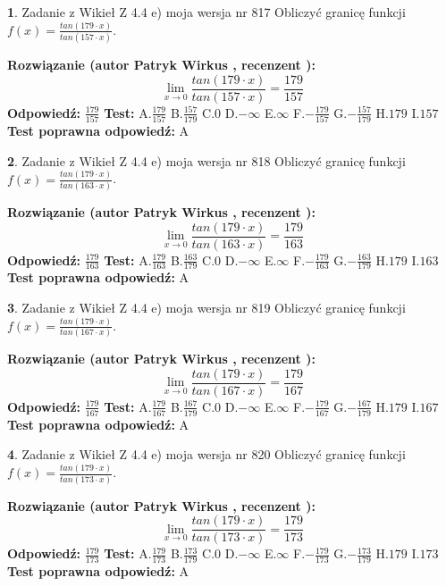 \documentclass[12pt, a4paper]{article}
\theoremstyle{definition} %
\newtheorem{zad}{}
\newcommand{\zadStart}[1]{\begin{zad}#1\newline}
\newcommand{\zadStop}{\end{zad}}
\newcommand{\rozwStart}[2]{\noindent \textbf{Rozwiązanie (autor #1 , recenzent #2): }\newline}
\newcommand{\rozwStop}{\newline}
\newcommand{\odpStart}{\noindent \textbf{Odpowiedź:}\newline}
\newcommand{\odpStop}{\newline}
\newcommand{\testStart}{\noindent \textbf{Test:}\newline}
\newcommand{\testStop}{\newline}
\newcommand{\kluczStart}{\noindent \textbf{Test poprawna odpowiedź:}\newline}
\newcommand{\kluczStop}{\newline}
\begin{document}
\zadStart{Zadanie z Wikieł Z 4.4 e) moja wersja nr 817}
Obliczyć granicę funkcji $f(x)=\frac{tan(179\cdot x)}{tan(157\cdot x)}$.
\zadStop
\rozwStart{Patryk Wirkus}{}
$$\lim\limits_{x\to 0}\frac{tan(179\cdot x)}{tan(157\cdot x)}=
\frac{179}{157}$$
\rozwStop
\odpStart
$\frac{179}{157}$
\odpStop
\testStart
A.$\frac{179}{157}$
B.$\frac{157}{179}$
C.$0$
D.$-\infty$
E.$\infty$
F.$-\frac{179}{157}$
G.$-\frac{157}{179}$
H.$179$
I.$157$
\testStop
\kluczStart
A
\kluczStop



\zadStart{Zadanie z Wikieł Z 4.4 e) moja wersja nr 818}
Obliczyć granicę funkcji $f(x)=\frac{tan(179\cdot x)}{tan(163\cdot x)}$.
\zadStop
\rozwStart{Patryk Wirkus}{}
$$\lim\limits_{x\to 0}\frac{tan(179\cdot x)}{tan(163\cdot x)}=
\frac{179}{163}$$
\rozwStop
\odpStart
$\frac{179}{163}$
\odpStop
\testStart
A.$\frac{179}{163}$
B.$\frac{163}{179}$
C.$0$
D.$-\infty$
E.$\infty$
F.$-\frac{179}{163}$
G.$-\frac{163}{179}$
H.$179$
I.$163$
\testStop
\kluczStart
A
\kluczStop



\zadStart{Zadanie z Wikieł Z 4.4 e) moja wersja nr 819}
Obliczyć granicę funkcji $f(x)=\frac{tan(179\cdot x)}{tan(167\cdot x)}$.
\zadStop
\rozwStart{Patryk Wirkus}{}
$$\lim\limits_{x\to 0}\frac{tan(179\cdot x)}{tan(167\cdot x)}=
\frac{179}{167}$$
\rozwStop
\odpStart
$\frac{179}{167}$
\odpStop
\testStart
A.$\frac{179}{167}$
B.$\frac{167}{179}$
C.$0$
D.$-\infty$
E.$\infty$
F.$-\frac{179}{167}$
G.$-\frac{167}{179}$
H.$179$
I.$167$
\testStop
\kluczStart
A
\kluczStop



\zadStart{Zadanie z Wikieł Z 4.4 e) moja wersja nr 820}
Obliczyć granicę funkcji $f(x)=\frac{tan(179\cdot x)}{tan(173\cdot x)}$.
\zadStop
\rozwStart{Patryk Wirkus}{}
$$\lim\limits_{x\to 0}\frac{tan(179\cdot x)}{tan(173\cdot x)}=
\frac{179}{173}$$
\rozwStop
\odpStart
$\frac{179}{173}$
\odpStop
\testStart
A.$\frac{179}{173}$
B.$\frac{173}{179}$
C.$0$
D.$-\infty$
E.$\infty$
F.$-\frac{179}{173}$
G.$-\frac{173}{179}$
H.$179$
I.$173$
\testStop
\kluczStart
A
\kluczStop
\end{document}
